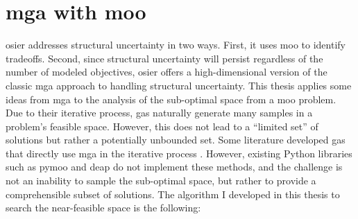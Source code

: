 \section{\acs{mga} with \acl{moo}}
\label{section:mga-moo}

\ac{osier} addresses structural uncertainty in two ways. First, it uses 
\ac{moo} to identify tradeoffs. Second, since structural uncertainty will
persist regardless of the number of modeled objectives, \ac{osier} offers
a high-dimensional version of the classic \ac{mga} approach to handling
structural uncertainty.
This thesis applies some ideas from \ac{mga} to the analysis of the sub-optimal
space from a \acl{moo} problem. Due to their iterative process, \acp{ga}
naturally generate many samples in a problem's feasible space. However, this
does not lead to a ``limited set'' of solutions but rather a potentially
unbounded set. Some literature developed \acp{ga} that directly use \ac{mga} in
the iterative process
\cite{zechman_evolutionary_2004,zechman_evolutionary_2013}. However, existing
Python libraries such as \ac{pymoo} and \ac{deap} do not implement these
methods, and the challenge is not an inability to sample the sub-optimal space,
but rather to provide a comprehensible subset of solutions. The algorithm I
developed in this thesis to search the near-feasible space is the following:

